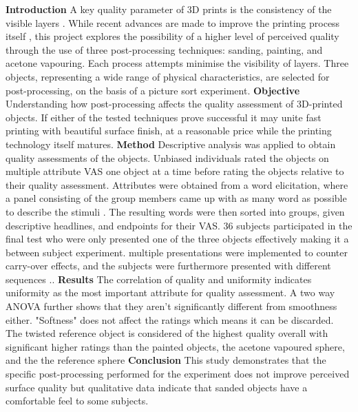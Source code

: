 \noindent
\textbf{Introduction}
A key quality parameter of 3D prints is the consistency of the visible layers \parencite{PDF:TextureBasedQualityAssessment}. While recent advances are made to improve the printing process itself \parencite{PDF:A3DPrintingPathOptimizerBasedOnChristofidesAlgorithm}, this project explores the possibility of a higher level of perceived quality through the use of three post-processing techniques: sanding, painting, and acetone vapouring. Each process attempts minimise the visibility of layers. Three objects, representing a wide range of physical characteristics, are selected for post-processing, on the basis of a picture sort experiment.
\blankline
\textbf{Objective}
Understanding how post-processing affects the quality assessment of 3D-printed objects. If either of the tested techniques prove successful it may unite fast printing with beautiful surface finish, at a reasonable price while the printing technology itself matures. 
\blankline
\textbf{Method}
Descriptive analysis was applied to obtain quality assessments of the objects. Unbiased individuals rated the objects on multiple attribute VAS one object at a time before rating the objects relative to their quality assessment. Attributes were obtained from a word elicitation, where a panel consisting of the group members came up with as many word as possible to describe the stimuli \parencite{PDF:DescriptiveAnalysis}. The resulting words were then sorted into groups, given descriptive headlines, and endpoints for their VAS. 36 subjects participated in the final test who were only presented one of the three objects effectively making it a between subject experiment. multiple presentations were implemented to counter carry-over effects, and the subjects were furthermore presented with different sequences \parencite{PDF:DescriptiveAnalysis}.. 
\blankline
\textbf{Results}
The correlation of quality and uniformity indicates uniformity as the most important attribute for quality assessment. A two way ANOVA further shows that they aren't significantly different from smoothness either. "Softness" does not affect the ratings which means it can be discarded. The twisted reference object is considered of the highest quality overall with significant higher ratings than the painted objects, the acetone vapoured sphere, and the the reference sphere
\blankline
\textbf{Conclusion}
This study demonstrates that the specific post-processing performed for the experiment does not improve perceived surface quality but qualitative data indicate that sanded objects have a comfortable feel to some subjects.